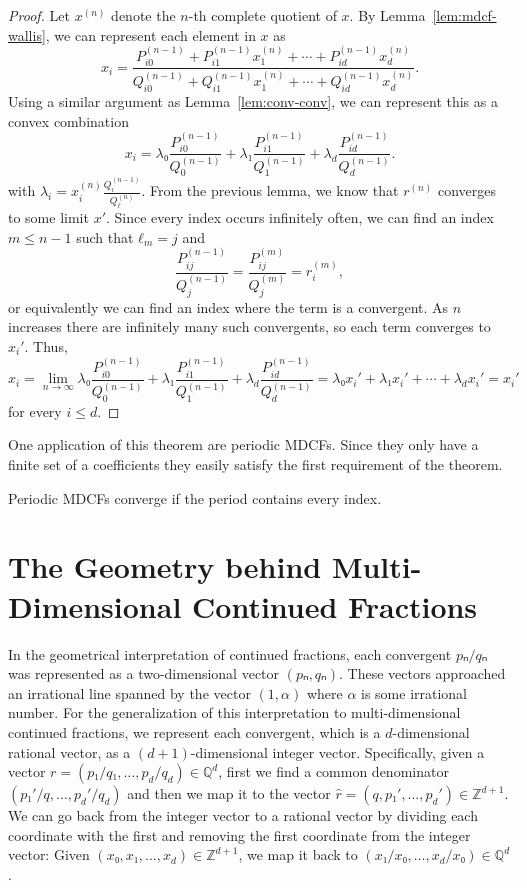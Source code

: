 \begin{proof}
  Let $x^{(n)}$ denote the $n$-th complete quotient of $x$.
  By Lemma~\ref{lem:mdcf-wallis}, we can represent each element in $x$ as
  \[
    x_i = \frac{P_{i0}^{(n-1)} + P_{i1}^{(n-1)} x_1^{(n)} + ⋯ + P_{id}^{(n-1)} x_d^{(n)}}{Q_{i0}^{(n-1)} + Q_{i1}^{(n-1)} x_1^{(n)} + ⋯ + Q_{id}^{(n-1)} x_d^{(n)}}.
  \]
  Using a similar argument as Lemma~\ref{lem:conv-conv}, we can represent this
  as a convex combination
  \[
    x_i = λ₀ \frac{P_{i0}^{(n-1)}}{Q_0^{(n-1)}}  + λ₁ \frac{P_{i1}^{(n-1)}}{Q_1^{(n-1)}} + λ_d \frac{P_{id}^{(n-1)}}{Q_d^{(n-1)}}.
  \]
  with $λ_i = x_i^{(n)} \frac{Q_i^{(n-1)}}{Q_ℓ^{(n)}}$.
  From the previous lemma, we know that $r^{(n)}$ converges to some limit $x'$.
  Since every index occurs infinitely often,
  we can find an index $m ≤ n - 1$ such that $ℓ_m = j$ and
  \[
    \frac{P_{ij}^{(n-1)}}{Q_j^{(n-1)}} = \frac{P_{ij}^{(m)}}{Q_j^{(m)}} = r_i^{(m)},
  \]
  or equivalently we can find an index where the term is a convergent.
  As $n$ increases there are infinitely many such convergents,
  so each term converges to $x_i'$.
  Thus,
  \[
    x_i
    = \lim_{n → ∞} λ₀ \frac{P_{i0}^{(n-1)}}{Q_0^{(n-1)}}  + λ₁ \frac{P_{i1}^{(n-1)}}{Q_1^{(n-1)}} + λ_d \frac{P_{id}^{(n-1)}}{Q_d^{(n-1)}}
    = λ₀ x_i' + λ₁ x_i' + ⋯ + λ_d x_i'
    = x_i'
  \]
  for every $i ≤ d$.
\end{proof}

One application of this theorem are periodic MDCFs.
Since they only have a finite set of a coefficients they easily satisfy the
first requirement of the theorem.

\begin{corollary}
  Periodic MDCFs converge if the period contains every index.
\end{corollary}

\section{The Geometry behind Multi-Dimensional Continued Fractions}

In the geometrical interpretation of continued fractions,
each convergent $pₙ/qₙ$ was represented as a two-dimensional vector $(pₙ, qₙ)$.
These vectors approached an irrational line spanned by the vector $(1, α)$ where
$α$ is some irrational number.
For the generalization of this interpretation to multi-dimensional continued
fractions, we represent each convergent, which is a $d$-dimensional rational vector,
as a $(d+1)$-dimensional integer vector.
Specifically, given a vector $r = (p₁/q₁, …, p_d/q_d) ∈ ℚ^d$, first we find a
common denominator $(p₁'/q, …, p_d'/q_d)$ and then we map it to the vector
$\hat r = (q, p₁', …, p_d') ∈ ℤ^{d+1}$.
We can go back from the integer vector to a rational vector by dividing each
coordinate with the first and removing the first coordinate from the integer
vector:
Given $(x₀, x₁, …, x_d) ∈ ℤ^{d+1}$, we map it back to $(x₁/x₀, …, x_d/x₀) ∈ ℚ^d$.

